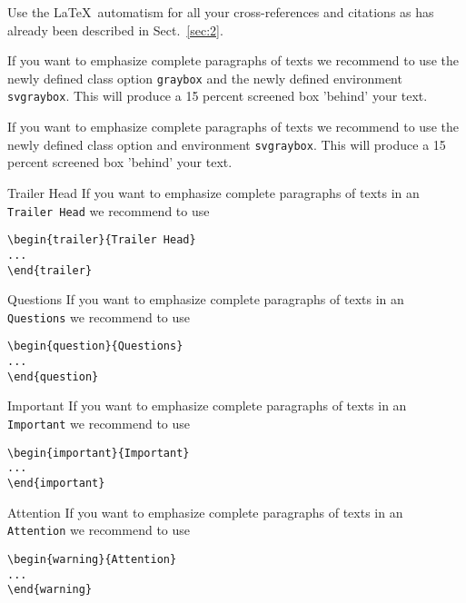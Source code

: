 \documentclass[graybox]{svmult}
\begin{document}
 Use the \LaTeX\ automatism for all your cross-refer\-ences and citations as has already been described in Sect.~\ref{sec:2}.

\begin{svgraybox}
If you want to emphasize complete paragraphs of texts we recommend to use the newly defined class option \verb|graybox| and the newly defined environment \verb|svgraybox|. This will produce a 15 percent screened box 'behind' your text.

If you want to emphasize complete paragraphs of texts we recommend to use the newly defined class option and environment \verb|svgraybox|. This will produce a 15 percent screened box 'behind' your text.
\end{svgraybox}

\begin{trailer}{Trailer Head}
If you want to emphasize complete paragraphs of texts in an \verb|Trailer Head| we recommend to
use  \begin{verbatim}\begin{trailer}{Trailer Head}
...
\end{trailer}\end{verbatim}
\end{trailer}
%
\begin{question}{Questions}
If you want to emphasize complete paragraphs of texts in an \verb|Questions| we recommend to
use  \begin{verbatim}\begin{question}{Questions}
...
\end{question}\end{verbatim}
\end{question}
\eject%
\begin{important}{Important}
If you want to emphasize complete paragraphs of texts in an \verb|Important| we recommend to
use  \begin{verbatim}\begin{important}{Important}
...
\end{important}\end{verbatim}
\end{important}
%
\begin{warning}{Attention}
If you want to emphasize complete paragraphs of texts in an \verb|Attention| we recommend to
use  \begin{verbatim}\begin{warning}{Attention}
...
\end{warning}\end{verbatim}
\end{warning}
\end{document}
